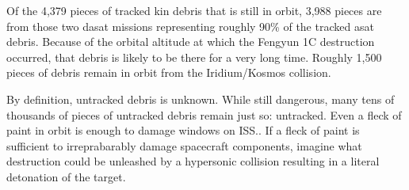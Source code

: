 Of the 4,379 pieces of tracked \ac{kin} debris that is still in orbit,
3,988 pieces are from those two \ac{dasat} missions representing
roughly 90\% of the tracked \ac{asat} debris.\cite[Table 5-1,
  p05-01]{brian} Because of the orbital altitude at which the Fengyun
1C destruction occurred, that debris is likely to be there for a very
long time.\cite{osa-debris} Roughly 1,500 pieces of debris remain
in orbit from the Iridium/Kosmos collision.

By definition, untracked debris is unknown.  While still dangerous,
many tens of thousands of pieces of untracked debris remain just so:
untracked.\cite[p05-01]{brian} Even a fleck of paint in orbit is
enough to damage windows on ISS.\cite[dig this one up]{xxx}.  If a
fleck of paint is sufficient to irreprabarably damage spacecraft
components, imagine what destruction could be unleashed by a
hypersonic collision resulting in a literal detonation of the
target.\cite[one of the hypersonic papers]{xxx}
